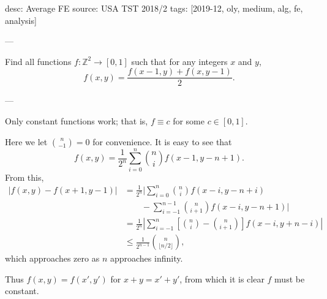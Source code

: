 desc: Average FE
source: USA TST 2018/2
tags: [2019-12, oly, medium, alg, fe, analysis]

---

Find all functions $f:\mathbb Z^2\to[0,1]$ such that for any integers $x$ and $y$, \[f(x,y)=\frac{f(x-1,y)+f(x,y-1)}2.\]

---

Only constant functions work; that is, $f\equiv c$ for some $c\in[0,1]$.

Here we let $\binom n{-1}=0$ for convenience. It is easy to see that \[f(x,y)=\frac1{2^n}\sum_{i=0}^n\binom nif(x-1,y-n+1).\]
From this,
\begin{align*}
    \Big\lvert f(x,y)-f(x+1,y-1)\Big\rvert&=\frac1{2^n}\Bigg\lvert\sum_{i=0}^n\binom nif(x-i,y-n+i)\\
    &\qquad-\sum_{i=-1}^{n-1}\binom n{i+1}f(x-i,y-n+1)\Bigg\rvert\\
    &=\frac1{2^n}\left\lvert\sum_{i=-1}^n\left[\binom ni-\binom n{i+1}\right]f(x-i,y+n-i)\right\rvert\\
    &\le\frac1{2^{n-1}}\binom n{\lfloor n/2\rfloor},
\end{align*}
which approaches zero as $n$ approaches infinity.

Thus $f(x,y)=f(x',y')$ for $x+y=x'+y'$, from which it is clear $f$ must be constant.
